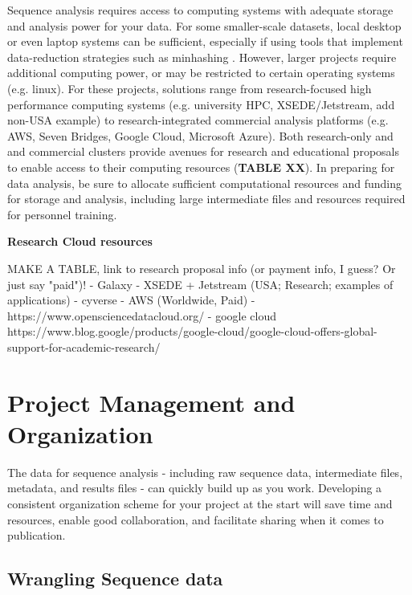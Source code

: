 \documentclass[10pt,letterpaper]{article}
\begin{document}
Sequence analysis requires access to computing systems with adequate storage and analysis power for your data. 
For some smaller-scale datasets, local desktop or even laptop systems can be sufficient, especially if using tools that implement data-reduction strategies such as minhashing \cite{rowe2019streaming}. 
However, larger projects require additional computing power, or may be restricted to certain operating systems (e.g. linux). 
For these projects, solutions range from research-focused high performance computing systems (e.g. university HPC, XSEDE/Jetstream, add non-USA example) to research-integrated commercial analysis platforms (e.g. AWS, Seven Bridges, Google Cloud, Microsoft Azure). 
Both research-only and  and commercial clusters provide avenues for research and educational proposals to enable access to their computing resources (\textbf{TABLE XX}). 
In preparing for data analysis, be sure to allocate sufficient computational resources and funding for storage and analysis, including large intermediate files and resources required for personnel training. 


\begin{greybox}{\textbf{Research Cloud resources}
 
MAKE A TABLE, link to research proposal info (or payment info, I guess? Or just say "paid")!
   - Galaxy
   - XSEDE + Jetstream (USA; Research; examples of applications)
   - cyverse
   - AWS (Worldwide, Paid)
   - https://www.opensciencedatacloud.org/
   - google cloud https://www.blog.google/products/google-cloud/google-cloud-offers-global-support-for-academic-research/
   }
 \end{greybox}

\section*{Project Management and Organization}

The data for sequence analysis - including raw sequence data, intermediate files, metadata, and results files - can quickly build up as you work. Developing a consistent organization scheme for your project at the start will save time and resources, enable good collaboration, and facilitate sharing when it comes to publication. 

\subsection*{Wrangling Sequence data}
\end{document}
